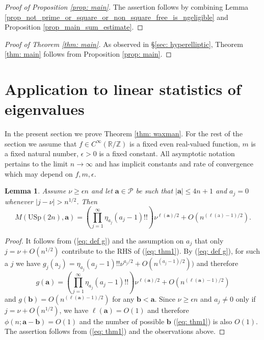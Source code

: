 \documentclass[alphabetic, 
        colorlinks,
        linkcolor=red,  citecolor=blue,
        backref
]{amsart}
\numberwithin{equation}{section}
\newtheorem{lem}[claim]{Lemma}
\theoremstyle{definition}
\newcommand{\Z}{{\mathbb Z}}
\newcommand{\R}{{\mathbb R}}
\newcommand{\USp}{{\mathrm{USp}}}
\begin{document}
\begin{proof}[Proof of Proposition \ref{prop: main}]
The assertion follows by combining Lemma \ref{prop_not_prime_or_square_or_non_square_free_is_ngeligible} and Proposition \ref{prop_main_sum_estimate}.
\end{proof}

\begin{proof}[Proof of Theorem \ref{thm: main}] As observed in \S\ref{sec: hyperelliptic}, Theorem \ref{thm: main} follows from Proposition \ref{prop: main}.\end{proof}

\section{Application to linear statistics of eigenvalues}
\label{sec: waxman}

In the present section we prove Theorem \ref{thm: waxman}.
For the rest of the section we assume that $f\in C^{\infty}(\R/\Z)$ is a fixed even real-valued function, $m$ is a fixed natural number, $\epsilon>0$ is a fixed constant. All asymptotic notation pertains to the limit $n\to\infty$ and has implicit constants and rate of convergence which may depend on $f,m,\epsilon$.



\begin{lem}\label{lem: waxman} Assume $\nu\ge\epsilon n$ and let $\mathbf a\in\mathcal P$ be such that $|\mathbf a|\le 4n+1$ and $a_j=0$ whenever $|j-\nu|>n^{1/2}$. Then $$M(\USp(2n),\mathbf a)=\left(\prod_{j=1}^\infty \eta_{a_j}(a_j-1)!!\right)\nu^{\ell(\mathbf a)/2}+O\left(n^{(\ell(\mathrm a)-1)/2}\right).$$\end{lem}

\begin{proof}
It follows from (\ref{eq: def g}) and the assumption on $a_j$ that only $j=\nu+O(n^{1/2})$ contribute to the RHS of (\ref{eq: thm1}). By (\ref{eq: def g}), for such a $j$ we have $g_j(\mathrm a_j)=\eta_{a_j}(a_j-1)!!\nu^{a_j/2}+O\left(n^{(a_j-1)/2}\right))$ and therefore $$g(\mathbf a)=\left(\prod_{j=1}^\infty \eta_{a_j}(a_j-1)!!\right)\nu^{\ell(\mathbf a)/2}+O\left(n^{(\ell(\mathbf a)-1)/2}\right)$$ and $g(\mathbf b)=O(n^{(\ell(\mathbf a)-1)/2})$ for any $\mathbf b<\mathbf a$. Since $\nu\ge\epsilon n$ and $a_j\neq 0$ only if $j=\nu+O(n^{1/2})$, we have $\ell(\mathbf a)=O(1)$ and therefore $\phi(n;\mathbf a-\mathbf b)=O(1)$ and the number of possible $\mathbf b$ (\ref{eq: thm1}) is also $O(1)$. The assertion follows from (\ref{eq: thm1}) and the observations above.
\end{proof}
\end{document}
